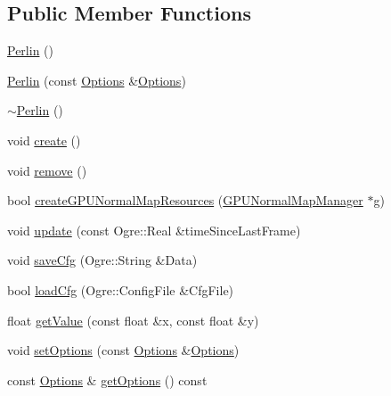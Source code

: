 \subsection*{Public Member Functions}
\begin{CompactItemize}
\item 
\hyperlink{class_hydrax_1_1_noise_1_1_perlin_65eccde5668e55133aef2f57f02613c2}{Perlin} ()
\item 
\hyperlink{class_hydrax_1_1_noise_1_1_perlin_363743192e0e9e9ab8bc4ff9f771e06c}{Perlin} (const \hyperlink{struct_hydrax_1_1_noise_1_1_perlin_1_1_options}{Options} \&\hyperlink{struct_hydrax_1_1_noise_1_1_perlin_1_1_options}{Options})
\item 
\hyperlink{class_hydrax_1_1_noise_1_1_perlin_472506339005ea5196846d26bb8fd4c1}{$\sim$Perlin} ()
\item 
void \hyperlink{class_hydrax_1_1_noise_1_1_perlin_3e260e7c239d90da210aa3e27289c6f0}{create} ()
\item 
void \hyperlink{class_hydrax_1_1_noise_1_1_perlin_666010a5142bbb2b03c97aa5aa7bdef1}{remove} ()
\item 
bool \hyperlink{class_hydrax_1_1_noise_1_1_perlin_db347b98692bd7ce6ad7ce76c605d15a}{createGPUNormalMapResources} (\hyperlink{class_hydrax_1_1_g_p_u_normal_map_manager}{GPUNormalMapManager} $\ast$g)
\item 
void \hyperlink{class_hydrax_1_1_noise_1_1_perlin_2037c02fa7d577eb72487a1b778b62dd}{update} (const Ogre::Real \&timeSinceLastFrame)
\item 
void \hyperlink{class_hydrax_1_1_noise_1_1_perlin_4f1f70a3375ac2b2f5e09011e7cc7ef3}{saveCfg} (Ogre::String \&Data)
\item 
bool \hyperlink{class_hydrax_1_1_noise_1_1_perlin_3a2dab14cfbda1ccf8fc5de4bb89f124}{loadCfg} (Ogre::ConfigFile \&CfgFile)
\item 
float \hyperlink{class_hydrax_1_1_noise_1_1_perlin_64bbe19643e0a87c08c62d0e73d7aac6}{getValue} (const float \&x, const float \&y)
\item 
void \hyperlink{class_hydrax_1_1_noise_1_1_perlin_f32b1054557536eb5073e9ad1251a4cf}{setOptions} (const \hyperlink{struct_hydrax_1_1_noise_1_1_perlin_1_1_options}{Options} \&\hyperlink{struct_hydrax_1_1_noise_1_1_perlin_1_1_options}{Options})
\item 
const \hyperlink{struct_hydrax_1_1_noise_1_1_perlin_1_1_options}{Options} \& \hyperlink{class_hydrax_1_1_noise_1_1_perlin_9264b637fe60ec9edf77c5e64881a62f}{getOptions} () const 
\end{CompactItemize}


